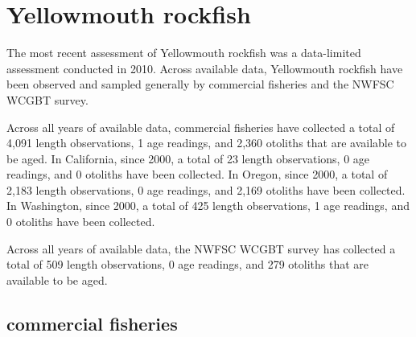 \documentclass[11pt,
  english,
  letterpaper,
]{article}
\begin{document}

\hypertarget{yellowmouth-rockfish}{%
\section{Yellowmouth rockfish}\label{yellowmouth-rockfish}}

\leavevmode\tagmcend\tagstructend


The most recent assessment of Yellowmouth rockfish was a data-limited assessment conducted in 2010. Across available data, Yellowmouth rockfish have been observed and sampled generally by commercial fisheries and the NWFSC WCGBT survey.

\leavevmode\tagmcend\tagstructend\par


Across all years of available data, commercial fisheries have collected a total of 4,091 length observations, 1 age readings, and 2,360 otoliths that are available to be aged. In California, since 2000, a total of 23 length observations, 0 age readings, and 0 otoliths have been collected. In Oregon, since 2000, a total of 2,183 length observations, 0 age readings, and 2,169 otoliths have been collected. In Washington, since 2000, a total of 425 length observations, 1 age readings, and 0 otoliths have been collected.

\leavevmode\tagmcend\tagstructend\par


Across all years of available data, the NWFSC WCGBT survey has collected a total of 509 length observations, 0 age readings, and 279 otoliths that are available to be aged.

\leavevmode\tagmcend\tagstructend\par


\hypertarget{commercial-fisheries-59}{%
\subsection{commercial fisheries}\label{commercial-fisheries-59}}

\leavevmode\tagmcend\tagstructend

\end{document}
